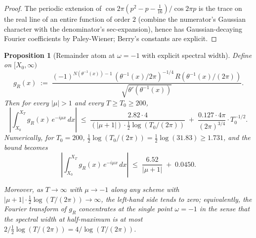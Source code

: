 \documentclass[11pt]{article}
\newtheorem{proposition}{Proposition}
\begin{document}
\begin{proof}
The periodic extension of $\cos 2\pi(p^{2}-p-\tfrac{1}{16})/\cos 2\pi p$ is the trace on the real line of an entire function of order $2$ (combine the numerator's Gaussian character with the denominator's sec-expansion), hence has Gaussian-decaying Fourier coefficients by Paley-Wiener; Berry's constants are explicit.
\end{proof}

\begin{proposition}[Remainder atom at $\omega=-1$ with explicit spectral width]\label{prop:Ratom}
Define on $[X_{0},\infty)$
\[
  g_{R}(x) \;:=\; \frac{(-1)^{N(\theta^{-1}(x))-1}\,(\theta^{-1}(x)/2\pi)^{-1/4}\,R(\theta^{-1}(x)/(2\pi))}{\sqrt{\theta'(\theta^{-1}(x))}}.
\]
Then for every $|\mu|>1$ and every $T\ge T_{0}\ge 200$,
\[
  \left|\int_{X_{0}}^{X_{T}} g_{R}(x)\,e^{-i\mu x}\,dx\right|
  \;\le\; \frac{2.82\cdot 4}{(|\mu+1|)\cdot\tfrac12\log(T_{0}/(2\pi))} \;+\; \frac{0.127\cdot 4\pi}{(2\pi)^{3/4}}\cdot T_{0}^{-1/2}.
\]
Numerically, for $T_{0} = 200$, $\tfrac12\log(T_{0}/(2\pi)) = \tfrac12\log(31.83) \ge 1.731$, and the bound becomes
\[
  \left|\int_{X_{0}}^{X_{T}} g_{R}(x)\,e^{-i\mu x}\,dx\right|
  \;\le\; \frac{6.52}{|\mu+1|} \;+\; 0.0450.
\]

Moreover, as $T\to\infty$ with $\mu\to -1$ along any scheme with $|\mu+1|\cdot \tfrac12\log(T/(2\pi))\to\infty$, the left-hand side tends to zero; equivalently, the Fourier transform of $g_{R}$ concentrates at the single point $\omega=-1$ in the sense that the spectral width at half-maximum is at most $2/\tfrac12\log(T/(2\pi)) = 4/\log(T/(2\pi))$.
\end{proposition}
\end{document}
